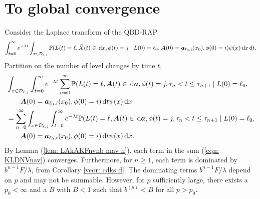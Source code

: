 \section{To global convergence}\label{sec: local to global}
Consider the Laplace transform of the QBD-RAP 
\begin{align}
	\int_{t=0}^\infty e^{-\lambda t}\int_{x\in\mathcal D_{\ell,j}}\mathbb P(L(t) = \ell, \bar X(t) \in \, \mathrm{d} x, \phi(t) = j \mid L(0)=\ell_0, \boldsymbol A(0)=\boldsymbol  a_{\ell_0,i}(x_0), \phi(0)=i)\psi(x)\, \mathrm{d} x\, \mathrm{d} t.
\end{align}
Partition on the number of level changes by time \(t\), 
\begin{align}
	&\int_{x\in\mathcal D_{\ell,j}} \int_{t=0}^\infty e^{-\lambda t}\sum_{n=0}^\infty \mathbb P(L(t) = \ell, \boldsymbol A(t) \in \, \mathrm{d} \boldsymbol a, \phi(t) = j, \tau_{n}< t \leq\tau_{n+1} \mid L(0)=\ell_0, \nonumber
	\\&\qquad{}\boldsymbol A(0)=\boldsymbol  a_{\ell_0,i}(x_0), \phi(0)=i)\, \mathrm{d} t \psi(x)\, \mathrm{d} x \nonumber
	\\&=\sum_{n=0}^\infty\int_{x\in\mathcal D_{\ell,j}}\int_{t=0}^\infty e^{-\lambda t} \mathbb P(L(t) = \ell, \boldsymbol A(t) \in \, \mathrm{d} \boldsymbol a, \phi(t) = j, \tau_{n}< t \leq\tau_{n+1} \mid L(0)=\ell_0, \nonumber
	\\&\qquad{}\boldsymbol A(0)=\boldsymbol  a_{\ell_0,i}(x_0), \phi(0)=i)\, \mathrm{d} t \psi(x) \, \mathrm{d} x. \label{eqn: KLDNVnav}
\end{align}
By Lemma (\ref{lem: LAkAKFnvnb mav h}), each term in the sum (\ref{eqn: KLDNVnav}) converges. Furthermore, for \(n\geq 1\), each term is dominated by \(b^{n-1}F/\lambda\), from Corollary \ref{vcor: cdks d}. The dominating terms \(b^{n-1}F/\lambda\) depend on \(p\) and may not be summable. However, for \(p\) sufficiently large, there exists a \(p_0<\infty\) and a \(B\) with \(B<1\) such that \(b^{(p)}<B\) for all \(p>p_0\). 

